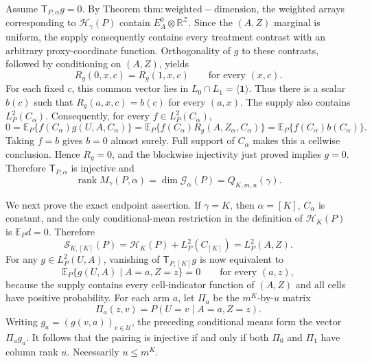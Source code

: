 Assume \(\mathsf T_{P,\alpha}g=0\). By Theorem \(\mathrm{thm:weighted-dimension}\), the weighted arrays corresponding to \(\mathcal H_\gamma(P)\) contain \(E_A^0\otimes\mathbb R^{\mathcal Z}\). Since the \((A,Z)\) marginal is uniform, the supply consequently contains every treatment contrast with an arbitrary proxy-coordinate function. Orthogonality of \(g\) to these contrasts, followed by conditioning on \((A,Z)\), yields
\[R_g(0,x,c)=R_g(1,x,c)\qquad\text{for every }(x,c).\]
For each fixed \(c\), this common vector lies in \(L_0\cap L_1=\langle\mathbf 1\rangle\). Thus there is a scalar \(b(c)\) such that \(R_g(a,x,c)=b(c)\) for every \((a,x)\). The supply also contains \(L_P^2(C_\alpha)\). Consequently, for every \(f\in L_P^2(C_\alpha)\),
\[0=\mathbb E_P\{f(C_\alpha)g(U,A,C_\alpha)\}=\mathbb E_P\{f(C_\alpha)R_g(A,Z_\alpha,C_\alpha)\}=\mathbb E_P\{f(C_\alpha)b(C_\alpha)\}.\]
Taking \(f=b\) gives \(b=0\) almost surely. Full support of \(C_\alpha\) makes this a cellwise conclusion. Hence \(R_g=0\), and the blockwise injectivity just proved implies \(g=0\). Therefore \(\mathsf T_{P,\alpha}\) is injective and
\[\operatorname{rank}M_\gamma(P,\alpha)=\dim\mathcal G_\alpha(P)=Q_{K,m,u}(\gamma).\]

We next prove the exact endpoint assertion. If \(\gamma=K\), then \(\alpha=[K]\), \(C_\alpha\) is constant, and the only conditional-mean restriction in the definition of \(\mathcal H_K(P)\) is \(\mathbb E_P d=0\). Therefore
\[\mathcal S_{K,[K]}(P)=\mathcal H_K(P)+L_P^2(C_{[K]})=L_P^2(A,Z).\]
For any \(g\in L_P^2(U,A)\), vanishing of \(\mathsf T_{P,[K]}g\) is now equivalent to
\[\mathbb E_P\{g(U,A)\mid A=a,Z=z\}=0\qquad\text{for every }(a,z),\]
because the supply contains every cell-indicator function of \((A,Z)\) and all cells have positive probability. For each arm \(a\), let \(\Pi_a\) be the \(m^K\)-by-\(u\) matrix
\[\Pi_a(z,v)=P(U=v\mid A=a,Z=z).\]
Writing \(g_a=(g(v,a))_{v\in\mathcal U}\), the preceding conditional means form the vector \(\Pi_a g_a\). It follows that the pairing is injective if and only if both \(\Pi_0\) and \(\Pi_1\) have column rank \(u\). Necessarily \(u\le m^K\).

